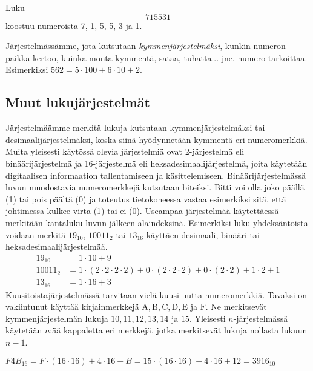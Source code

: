\begin{esimerkki}
Luku \[715531\] koostuu numeroista 7, 1, 5, 5, 3 ja 1.
\end{esimerkki}

Järjestelmässämme, jota kutsutaan \emph{kymmenjärjestelmäksi}, kunkin numeron paikka kertoo, kuinka monta kymmentä, sataa, tuhatta... jne. numero tarkoittaa. Esimerkiksi $562 = 5 \cdot 100 + 6 \cdot 10 + 2$.


\subsection*{Muut lukujärjestelmät}

Järjestelmäämme merkitä lukuja kutsutaan kymmenjärjestelmäksi tai desimaalijärjestelmäksi, koska siinä hyödynnetään kymmentä eri numeromerkkiä. Muita yleisesti käytössä olevia järjestelmiä ovat 2-järjestelmä eli binäärijärjestelmä ja 16-järjestelmä eli heksadesimaalijärjestelmä, joita käytetään digitaalisen informaation tallentamiseen ja käsittelemiseen. Binäärijärjestelmässä luvun muodostavia numeromerkkejä kutsutaan biteiksi. Bitti voi olla joko päällä (1) tai pois päältä (0) ja toteutus tietokoneessa vastaa esimerkiksi sitä, että johtimessa kulkee virta (1) tai ei (0). Useampaa järjestelmää käytettäessä merkitään kantaluku luvun jälkeen alaindeksinä. Esimerkiksi luku yhdeksäntoista voidaan merkitä $19_{10}$, $10011_{2}$ tai $13_{16}$ käyttäen desimaali, binääri tai heksadesimaalijärjestelmää.
\begin{align}
19_{10} &= 1 \cdot 10 + 9 \\
10011_{2} &= 1 \cdot (2 \cdot 2 \cdot 2 \cdot 2) + 0 \cdot (2 \cdot 2 \cdot 2) + 0 \cdot (2 \cdot 2) + 1 \cdot 2 + 1 \\
13_{16} &= 1 \cdot 16 + 3
\end{align}
Kuusitoistajärjestelmässä tarvitaan vielä kuusi uutta numeromerkkiä. Tavaksi on vakiintunut käyttää kirjainmerkkejä $\mathrm{A, B, C, D, E}$ ja $\mathrm{F}$. Ne merkitsevät kymmenjärjestelmän lukuja $10, 11, 12, 13, 14$ ja $15$. Yleisesti $n$-järjestelmässä käytetään $n$:ää kappaletta eri merkkejä, jotka merkitsevät lukuja nollasta lukuun $n-1$.
\begin{esimerkki}
$F4B_{16} = F \cdot (16 \cdot 16) + 4 \cdot 16 + B = 15 \cdot (16 \cdot 16) + 4 \cdot 16 + 12 = 3916_{10}$
\end{esimerkki}

